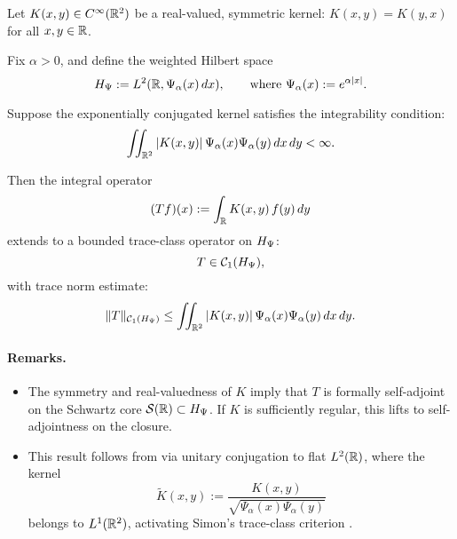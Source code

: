 \begin{lemma}
\label{lem:trace_class_conjugated_kernel}
Let \( K(x, y) \in C^\infty(\mathbb{R}^2) \) be a real-valued, symmetric kernel: \( K(x,y) = K(y,x) \) for all \( x,y \in \mathbb{R} \).

Fix \( \alpha > 0 \), and define the weighted Hilbert space
\[
H_{\Psi} := L^2(\mathbb{R}, \Psi_\alpha(x)\, dx), \qquad \text{where } \Psi_\alpha(x) := e^{\alpha |x|}.
\]

Suppose the exponentially conjugated kernel satisfies the integrability condition:
\[
\iint_{\mathbb{R}^2} |K(x, y)| \, \Psi_\alpha(x) \Psi_\alpha(y) \, dx\, dy < \infty.
\]

Then the integral operator
\[
(T f)(x) := \int_{\mathbb{R}} K(x, y)\, f(y)\, dy
\]
extends to a bounded trace-class operator on \( H_{\Psi} \):
\[
T \in \mathcal{C}_1(H_{\Psi}),
\]
with trace norm estimate:
\[
\| T \|_{\mathcal{C}_1(H_{\Psi})}
\le \iint_{\mathbb{R}^2} |K(x, y)|\, \Psi_\alpha(x)\Psi_\alpha(y)\, dx\, dy.
\]

\paragraph{Remarks.}
\begin{itemize}
    \item The symmetry and real-valuedness of \( K \) imply that \( T \) is formally self-adjoint on the Schwartz core \( \mathcal{S}(\mathbb{R}) \subset H_{\Psi} \). If \( K \) is sufficiently regular, this lifts to self-adjointness on the closure.

    \item This result follows from  via unitary conjugation to flat \( L^2(\mathbb{R}) \), where the kernel
    \[
    \widetilde{K}(x,y) := \frac{K(x,y)}{\sqrt{\Psi_\alpha(x)\Psi_\alpha(y)}}
    \]
    belongs to \( L^1(\mathbb{R}^2) \), activating Simon's trace-class criterion \cite[Thm.~4.2]{Simon2005TraceIdeals}.
\end{itemize}
\end{lemma}
